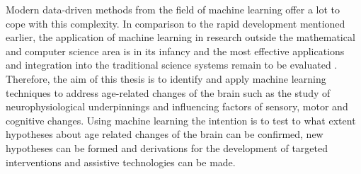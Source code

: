 Modern data-driven methods from the field of machine learning offer a lot to cope with this complexity. In comparison to the rapid development mentioned earlier, the application of machine learning in research outside the mathematical and computer science area is in its infancy and the most effective applications and integration into the traditional science systems remain to be evaluated \cite{Bzdok2019}. Therefore, the aim of this thesis is to identify and apply machine learning techniques to address age-related changes of the brain such as the study of neurophysiological underpinnings and influencing factors of sensory, motor and cognitive changes. Using machine learning the intention is to test to what extent hypotheses about age related changes of the brain can be confirmed, new hypotheses can be formed and derivations for the development of targeted interventions and assistive technologies can be made.







